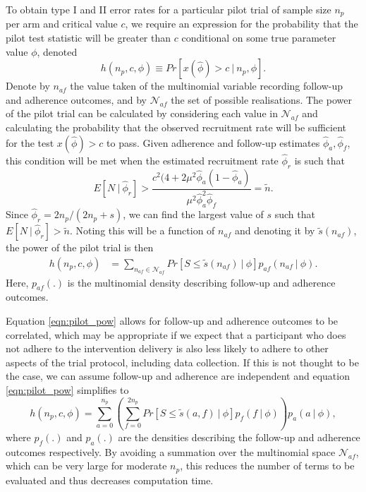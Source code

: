 \documentclass[AMA,STIX1COL]{WileyNJD-v2}
\begin{document}
To obtain type I and II error rates for a particular pilot trial of sample size $n_p$ per arm and critical value $c$, we require an expression for the probability that the pilot test statistic will be greater than $c$ conditional on some true parameter value $\phi$, denoted
$$
h(n_p, c, \phi) \equiv Pr[x(\hat{\phi}) > c ~|~ n_p, \phi].
$$
Denote by $n_{af}$ the value taken of the multinomial variable recording follow-up and adherence outcomes, and by $\mathcal{N}_{af}$ the set of possible realisations. The power of the pilot trial can be calculated by considering each value in $\mathcal{N}_{af}$ and calculating the probability that the observed recruitment rate will be sufficient for the test $x(\hat{\phi}) > c$ to pass. Given adherence and follow-up estimates $\hat{\phi}_a, \hat{\phi}_f$, this condition will be met when the estimated recruitment rate $\hat{\phi}_r$ is such that
$$
E[N ~|~ \hat{\phi}_r] > \frac{c^2(4 + 2 \mu^2 \hat{\phi}_a (1- \hat{\phi}_a)}{\mu^2 \hat{\phi}_a^2 \hat{\phi}_f} = \tilde{n}.
$$ 
Since $\hat{\phi}_r = 2n_p/(2n_p + s)$, we can find the largest value of $s$ such that $E[N ~|~ \hat{\phi}_r] > \tilde{n}$. Noting this will be a function of $n_{af}$ and denoting it by $\tilde{s}(n_{af})$, the power of the pilot trial is then
\begin{align}\label{eqn:pilot_pow}
h(n_p, c, \phi) &= \sum_{n_{af} \in \mathcal{N}_{af}} 
Pr\left[S \leq \tilde{s}(n_{af}) ~|~ \phi \right] 
p_{af}(n_{af} ~|~ \phi).
\end{align}
Here, $p_{af}(.)$ is the multinomial density describing follow-up and adherence outcomes.

Equation \ref{eqn:pilot_pow} allows for follow-up and adherence outcomes to be correlated, which may be appropriate if we expect that a participant who does not adhere to the intervention delivery is also less likely to adhere to other aspects of the trial protocol, including data collection. If this is not thought to be the case, we can assume follow-up and adherence are independent and equation \ref{eqn:pilot_pow} simplifies to
\begin{equation*}
h(n_p, c, \phi) = \sum_{a=0}^{n_p} \left(  \sum_{f=0}^{2n_p} 
Pr\left[S \leq \tilde{s}(a,f) ~|~ \phi \right] 
p_{f}(f ~|~ \phi)  \right) p_a(a ~|~ \phi),
\end{equation*}
where $p_f(.)$ and $p_a(.)$ are the densities describing the follow-up and adherence outcomes respectively. By avoiding a summation over the multinomial space $\mathcal{N}_{af}$, which can be very large for moderate $n_p$, this reduces the number of terms to be evaluated and thus decreases computation time.
\end{document}
